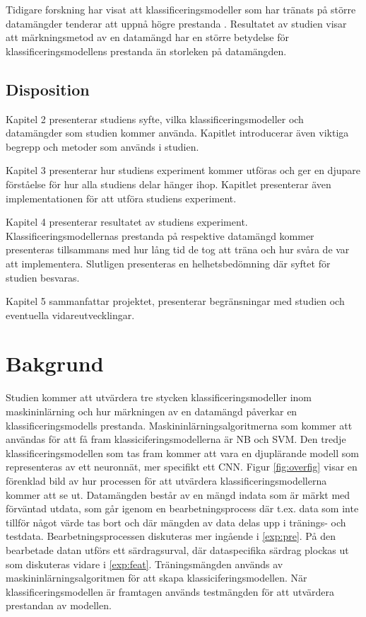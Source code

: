 \documentclass{kaumasters} %
\begin{document}
Tidigare forskning har visat att klassificeringsmodeller som har tränats på större datamängder tenderar att uppnå högre prestanda \cite{TSAsurvey}. Resultatet av studien visar att märkningsmetod av en datamängd har en större betydelse för klassificeringsmodellens prestanda än storleken på datamängden.

\section*{Disposition} \label{int:dis} 
Kapitel 2 presenterar studiens syfte, vilka klassificeringsmodeller och datamängder som studien kommer använda. Kapitlet introducerar även viktiga begrepp och metoder som används i studien.

Kapitel 3 presenterar hur studiens experiment kommer utföras och ger en djupare förståelse för hur alla studiens delar hänger ihop. Kapitlet presenterar även implementationen för att utföra studiens experiment. 

Kapitel 4 presenterar resultatet av studiens experiment. Klassificeringsmodellernas prestanda på respektive datamängd kommer presenteras tillsammans med hur lång tid de tog att träna och hur svåra de var att implementera. Slutligen presenteras en helhetsbedömning där syftet för studien besvaras.

Kapitel 5 sammanfattar projektet, presenterar begränsningar med studien och eventuella vidareutvecklingar.

\chapter{Bakgrund}\label{bak}
Studien kommer att utvärdera tre stycken klassificeringsmodeller inom maskininlärning och hur märkningen av en datamängd påverkar en klassificeringsmodells prestanda. Maskininlärningsalgoritmerna som kommer att användas för att få fram klassiciferingsmodellerna är NB och SVM. Den tredje klassificeringsmodellen som tas fram kommer att vara en djuplärande modell som representeras av ett neuronnät, mer specifikt ett CNN. Figur \ref{fig:overfig} visar en förenklad bild av hur processen för att utvärdera klassificeringsmodellerna kommer att se ut. Datamängden består av en mängd indata som är märkt med förväntad utdata, som går igenom en bearbetningsprocess där t.ex. data som inte tillför något värde tas bort och där mängden av data delas upp i tränings- och testdata.  Bearbetningsprocessen diskuteras mer ingående i \ref{exp:pre}. På den bearbetade datan utförs ett särdragsurval, där dataspecifika särdrag plockas ut som diskuteras vidare i \ref{exp:feat}. Träningsmängden används av maskininlärningsalgoritmen för att skapa klassiciferingsmodellen. När klassificeringsmodellen är framtagen används testmängden för att utvärdera prestandan av modellen.
\end{document}
